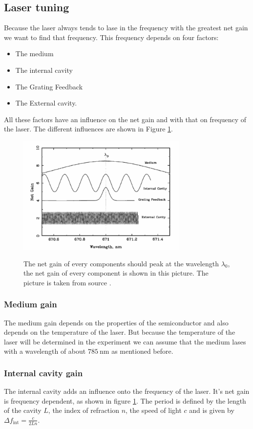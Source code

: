 \subsection{Laser tuning}
Because the laser always tends to lase in the frequency with the greatest net gain we want to find that frequency.
This frequency depends on four factors:
\begin{itemize}
    \item The medium
    \item The internal cavity
    \item The Grating Feedback
    \item The External cavity.
\end{itemize}
All these factors have an influence on the net gain and with that on frequency of the laser.
The different influences are shown in Figure \ref{fig:netgain}.
\begin{figure}
    \centering
    \caption{The net gain of every components should peak at the wavelength $\lambda_0$, the net gain of every component is shown in this picture. The picture is taken from source \cite[6]{anleitung_laser}.}
    \includegraphics[width=0.75\textwidth]{content/data/netgain.png}
    \label{fig:netgain}
\end{figure}
\FloatBarrier
\subsubsection{Medium gain}
The medium gain depends on the properties of the semiconductor and also depends on the temperature of the laser.
But because the temperature of the laser will be determined in the experiment we can assume that the medium lases with a wavelength of about $\SI{785}{\nano\meter}$ as mentioned before.

\subsubsection{Internal cavity gain}
The internal cavity adds an influence onto the frequency of the laser.
It's net gain is frequency dependent, as shown in figure \ref{fig:netgain}.
The period is defined by the length of the cavity $L$, the index of refraction $n$, the speed of light $c$ and is given by
$\Delta f_\text{int} = \frac{c}{2Ln}$.

